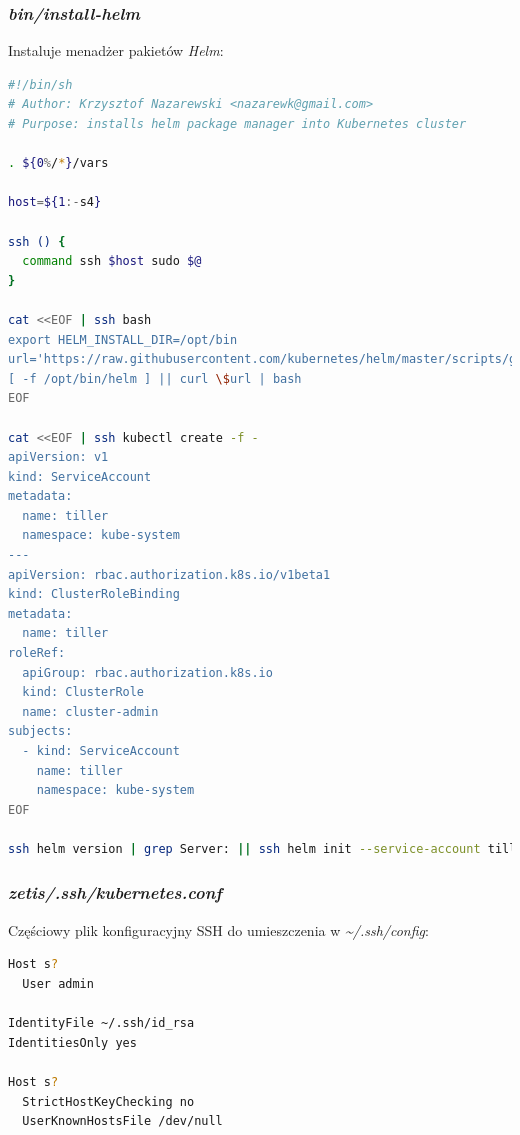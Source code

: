 \documentclass[a4paper,12pt,twoside,openany]{report}
\begin{document}
\newpage

\hypertarget{bininstall-helm}{%
\subsubsection{\texorpdfstring{\emph{bin/install-helm}}{bin/install-helm}}\label{bininstall-helm}}

Instaluje menadżer pakietów \emph{Helm}:

\begin{lstlisting}[language=bash]
#!/bin/sh
# Author: Krzysztof Nazarewski <nazarewk@gmail.com>
# Purpose: installs helm package manager into Kubernetes cluster

. ${0%/*}/vars

host=${1:-s4}

ssh () {
  command ssh $host sudo $@
}

cat <<EOF | ssh bash
export HELM_INSTALL_DIR=/opt/bin
url='https://raw.githubusercontent.com/kubernetes/helm/master/scripts/get'
[ -f /opt/bin/helm ] || curl \$url | bash
EOF

cat <<EOF | ssh kubectl create -f -
apiVersion: v1
kind: ServiceAccount
metadata:
  name: tiller
  namespace: kube-system
---
apiVersion: rbac.authorization.k8s.io/v1beta1
kind: ClusterRoleBinding
metadata:
  name: tiller
roleRef:
  apiGroup: rbac.authorization.k8s.io
  kind: ClusterRole
  name: cluster-admin
subjects:
  - kind: ServiceAccount
    name: tiller
    namespace: kube-system
EOF

ssh helm version | grep Server: || ssh helm init --service-account tiller
\end{lstlisting}

\hypertarget{zetis.sshkubernetes.conf}{%
\subsubsection{\texorpdfstring{\emph{zetis/.ssh/kubernetes.conf}}{zetis/.ssh/kubernetes.conf}}\label{zetis.sshkubernetes.conf}}

Częściowy plik konfiguracyjny SSH do umieszczenia w
\emph{\textasciitilde{}/.ssh/config}:

\begin{lstlisting}[language=bash]
Host s?
  User admin

IdentityFile ~/.ssh/id_rsa
IdentitiesOnly yes

Host s?
  StrictHostKeyChecking no
  UserKnownHostsFile /dev/null
\end{lstlisting}
\end{document}
